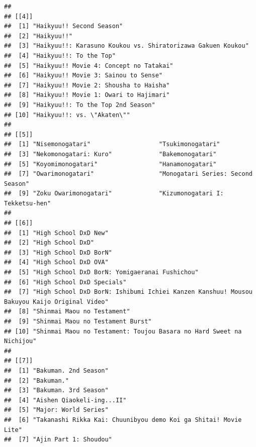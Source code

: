 \documentclass[
]{article}
\begin{document}
\begin{verbatim}
## 
## [[4]]
##  [1] "Haikyuu!! Second Season"                                   
##  [2] "Haikyuu!!"                                                 
##  [3] "Haikyuu!!: Karasuno Koukou vs. Shiratorizawa Gakuen Koukou"
##  [4] "Haikyuu!!: To the Top"                                     
##  [5] "Haikyuu!! Movie 4: Concept no Tatakai"                     
##  [6] "Haikyuu!! Movie 3: Sainou to Sense"                        
##  [7] "Haikyuu!! Movie 2: Shousha to Haisha"                      
##  [8] "Haikyuu!! Movie 1: Owari to Hajimari"                      
##  [9] "Haikyuu!!: To the Top 2nd Season"                          
## [10] "Haikyuu!!: vs. \"Akaten\""                                 
## 
## [[5]]
##  [1] "Nisemonogatari"                   "Tsukimonogatari"                 
##  [3] "Nekomonogatari: Kuro"             "Bakemonogatari"                  
##  [5] "Koyomimonogatari"                 "Hanamonogatari"                  
##  [7] "Owarimonogatari"                  "Monogatari Series: Second Season"
##  [9] "Zoku Owarimonogatari"             "Kizumonogatari I: Tekketsu-hen"  
## 
## [[6]]
##  [1] "High School DxD New"                                                                      
##  [2] "High School DxD"                                                                          
##  [3] "High School DxD BorN"                                                                     
##  [4] "High School DxD OVA"                                                                      
##  [5] "High School DxD BorN: Yomigaeranai Fushichou"                                             
##  [6] "High School DxD Specials"                                                                 
##  [7] "High School DxD BorN: Ishibumi Ichiei Kanzen Kanshuu! Mousou Bakuyou Kaijo Original Video"
##  [8] "Shinmai Maou no Testament"                                                                
##  [9] "Shinmai Maou no Testament Burst"                                                          
## [10] "Shinmai Maou no Testament: Toujou Basara no Hard Sweet na Nichijou"                       
## 
## [[7]]
##  [1] "Bakuman. 2nd Season"                                           
##  [2] "Bakuman."                                                      
##  [3] "Bakuman. 3rd Season"                                           
##  [4] "Aishen Qiaokeli-ing...II"                                      
##  [5] "Major: World Series"                                           
##  [6] "Takanashi Rikka Kai: Chuunibyou demo Koi ga Shitai! Movie Lite"
##  [7] "Ajin Part 1: Shoudou"                                          

\end{verbatim}
\end{document}
